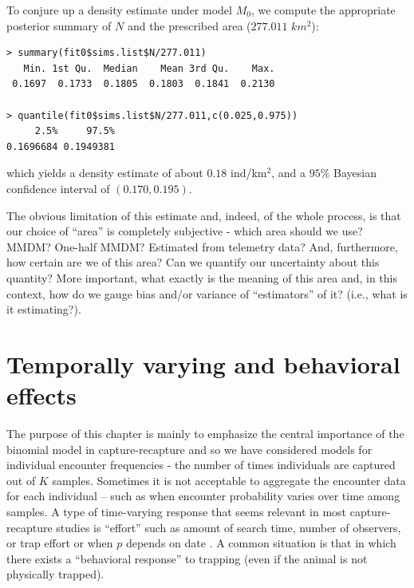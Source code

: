 To conjure up a 
density estimate under model $M_0$, we compute the appropriate
posterior summary of $N$ and the prescribed area ($277.011$ $km^2$):
\begin{verbatim}
> summary(fit0$sims.list$N/277.011)
   Min. 1st Qu.  Median    Mean 3rd Qu.    Max. 
 0.1697  0.1733  0.1805  0.1803  0.1841  0.2130 

> quantile(fit0$sims.list$N/277.011,c(0.025,0.975))
     2.5%     97.5% 
0.1696684 0.1949381 
\end{verbatim}
which yields a density estimate of about $0.18$ ind/km$^2$, and a $95\%$ Bayesian 
confidence interval of $(0.170, 0.195)$.

The obvious limitation of this estimate and, indeed, of the whole
process, is that our choice of ``area'' is completely subjective -
which area should we use? MMDM? One-half MMDM? Estimated from
telemetry data? And, furthermore, how certain are we of this area? Can
we quantify our uncertainty about this quantity?
 More important, what exactly is
the meaning of this area and, in this context, how do we gauge bias
and/or variance of ``estimators'' of it? (i.e., what is it
estimating?).

\section{Temporally varying and behavioral effects}

The purpose of this chapter is mainly to emphasize the central
importance of the binomial model in capture-recapture and so we have
considered models for individual encounter frequencies - the number of
times individuals are captured out of $K$ samples.  Sometimes it is
not acceptable to aggregate the encounter data for each individual --
such as when encounter probability varies over time among samples. A
type of time-varying response that seems relevant in most
capture-recapture studies is ``effort'' such as amount of search time,
number of observers, or trap effort
 or when $p$ depends on date
\citep{kery_etal:2010, gardner_etal:2010}.
  A common situation is that in
which there exists a ``behavioral response'' to trapping (even if the
animal is not physically trapped).


